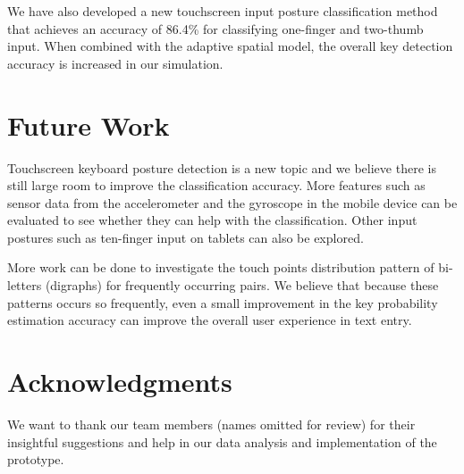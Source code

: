 \documentclass{sigchi}
\begin{document}
We have also developed a new touchscreen input posture classification method
that achieves an accuracy of 86.4\% for classifying one-finger and two-thumb input. When
combined with the adaptive spatial model, the overall key detection accuracy is increased
in our simulation.

\section{Future Work}
Touchscreen keyboard posture detection is a new topic and we believe there is still
large room to improve the classification accuracy. More features such as sensor data from 
the accelerometer and the gyroscope in the mobile device can be evaluated to see whether
they can help with the classification. Other input postures such as ten-finger input
on tablets can also be explored.

More work can be done to investigate the touch points distribution pattern of bi-letters (digraphs) 
for frequently occurring pairs. We believe that because these patterns occurs so frequently, even
a small improvement in the key probability estimation accuracy can improve the overall
user experience in text entry.  

\section{Acknowledgments}
We want to thank our team members (names omitted for review) for their insightful
suggestions and help in  our data analysis and implementation of the prototype. 

\balance

\small


\end{document}
